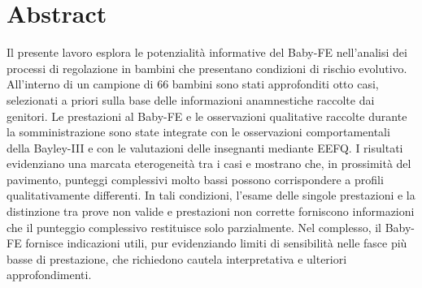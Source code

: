 \cleardoublepage
\chapter*{Abstract}
\vspace*{\dimexpr 3\baselineskip - 3.2pt\relax}
\pagestyle{plain}
\thispagestyle{plain}

\setlength{\parskip}{1em}

Il presente lavoro esplora le potenzialità informative del Baby-FE nell'analisi dei processi di regolazione in bambini che presentano condizioni di rischio evolutivo. All'interno di un campione di 66 bambini sono stati approfonditi otto casi, selezionati a priori sulla base delle informazioni anamnestiche raccolte dai genitori. Le prestazioni al Baby-FE e le osservazioni qualitative raccolte durante la somministrazione sono state integrate con le osservazioni comportamentali della Bayley-III e con le valutazioni delle insegnanti mediante EEFQ. I risultati evidenziano una marcata eterogeneità tra i casi e mostrano che, in prossimità del pavimento, punteggi complessivi molto bassi possono corrispondere a profili qualitativamente differenti. In tali condizioni, l'esame delle singole prestazioni e la distinzione tra prove non valide e prestazioni non corrette forniscono informazioni che il punteggio complessivo restituisce solo parzialmente. Nel complesso, il Baby-FE fornisce indicazioni utili, pur evidenziando limiti di sensibilità nelle fasce più basse di prestazione, che richiedono cautela interpretativa e ulteriori approfondimenti.

\setlength{\parskip}{0em}

